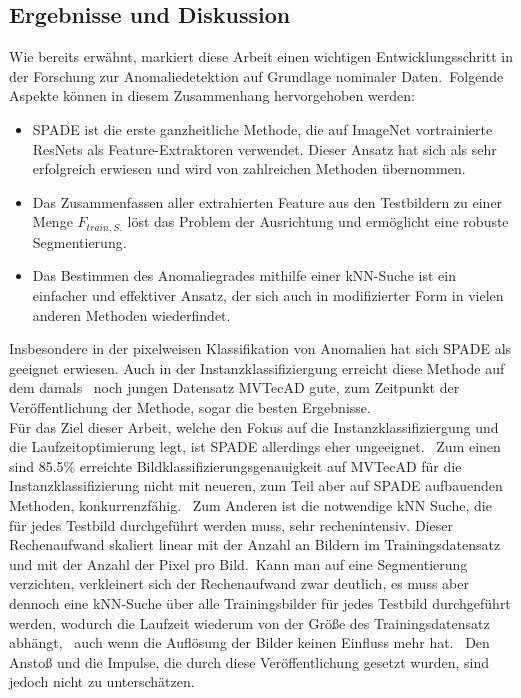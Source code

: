 \subsection{Ergebnisse und Diskussion}\label{subsec:SPADEResults}
Wie bereits erwähnt, markiert diese Arbeit einen wichtigen Entwicklungsschritt in der Forschung zur Anomaliedetektion auf Grundlage nominaler Daten.\
Folgende Aspekte können in diesem Zusammenhang hervorgehoben werden:
\begin{itemize}
  \item SPADE ist die erste ganzheitliche Methode, die auf ImageNet vortrainierte ResNets als Feature-Extraktoren verwendet. Dieser Ansatz hat sich als sehr erfolgreich erwiesen und wird von zahlreichen Methoden übernommen.\
  \item Das Zusammenfassen aller extrahierten Feature aus den Testbildern zu einer Menge $F_{train, S.}$ löst das Problem der Ausrichtung und ermöglicht eine robuste Segmentierung.\
  \item Das Bestimmen des Anomaliegrades mithilfe einer kNN-Suche ist ein einfacher und effektiver Ansatz, der sich auch in modifizierter Form in vielen anderen Methoden wiederfindet.\
\end{itemize}
Insbesondere in der pixelweisen Klassifikation von Anomalien hat sich SPADE als geeignet erwiesen. Auch in der Instanzklassifiziergung erreicht diese Methode auf dem damals \
noch jungen Datensatz MVTecAD gute, zum Zeitpunkt der Veröffentlichung der Methode, sogar die besten Ergebnisse.\\
Für das Ziel dieser Arbeit, welche den Fokus auf die Instanzklassifiziergung und die Laufzeitoptimierung legt, ist SPADE allerdings eher ungeeignet. \
Zum einen sind \num{85,5}\% erreichte Bildklassifizierungsgenauigkeit auf MVTecAD für die Instanzklassifizierung nicht mit neueren, zum Teil aber auf SPADE aufbauenden Methoden, konkurrenzfähig. \
Zum Anderen ist die notwendige kNN Suche, die für jedes Testbild durchgeführt werden muss, sehr rechenintensiv. Dieser Rechenaufwand skaliert linear mit der Anzahl an Bildern im Trainingsdatensatz und mit der Anzahl der Pixel pro Bild.\
Kann man auf eine Segmentierung verzichten, verkleinert sich der Rechenaufwand zwar deutlich, es muss aber dennoch eine kNN-Suche über alle Trainingsbilder für jedes Testbild durchgeführt werden, wodurch die Laufzeit wiederum von der Größe des Trainingsdatensatz abhängt, \ 
auch wenn die Auflösung der Bilder keinen Einfluss mehr hat. \
Den Anstoß und die Impulse, die durch diese Veröffentlichung gesetzt wurden, sind jedoch nicht zu unterschätzen. \
